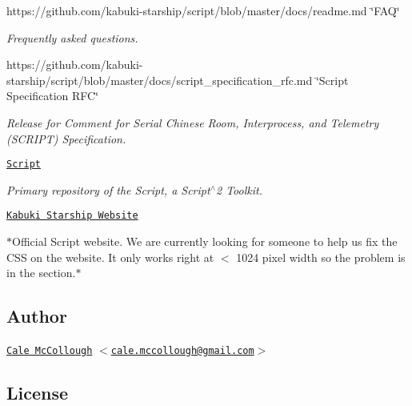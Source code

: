 \begin{DoxyItemize}
\item https\+://github.com/kabuki-\/starship/script/blob/master/docs/readme.\+md \char`\"{}\+F\+A\+Q\char`\"{}
\begin{DoxyItemize}
\item {\itshape Frequently asked questions.}
\end{DoxyItemize}
\item https\+://github.com/kabuki-\/starship/script/blob/master/docs/script\+\_\+specification\+\_\+rfc.\+md \char`\"{}\+Script Specification R\+F\+C\char`\"{}
\begin{DoxyItemize}
\item {\itshape Release for Comment for Serial Chinese Room, Interprocess, and Telemetry (S\+C\+R\+I\+PT) Specification.}
\end{DoxyItemize}
\item \href{https://github.com/kabuki-starship/kabuki-toolkit}{\tt Script}
\begin{DoxyItemize}
\item {\itshape Primary repository of the Script, a Script$^\wedge$2 Toolkit.}
\end{DoxyItemize}
\item \href{https://kabuki-starship.github.io/}{\tt Kabuki Starship Website}
\begin{DoxyItemize}
\item $\ast$\+Official Script website. We are currently looking for someone to help us fix the C\+SS on the website. It only works right at $<$ 1024 pixel width so the problem is in the  section.$\ast$
\end{DoxyItemize}
\end{DoxyItemize}

\subsection*{Author}


\begin{DoxyItemize}
\item \href{https://calemccollough.github.io}{\tt Cale Mc\+Collough} $<$\href{mailto:cale.mccollough@gmail.com}{\tt cale.\+mccollough@gmail.\+com}$>$
\end{DoxyItemize}

\subsection*{License}

